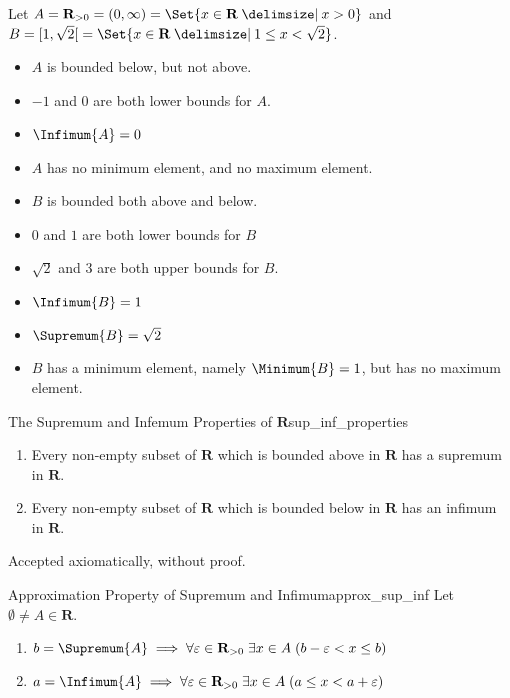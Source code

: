 \begin{Example}{}{}
    Let $ A=\mathbf{R}_{>0}=(0,\infty)=\Set{x\in\mathbf{R}\given x>0} $
    and $ B=\interval[open right]{1}{\sqrt{2}}
        =\Set{x\in\mathbf{R}\given 1\le x<\sqrt{2}} $.
    \begin{itemize}
        \item $ A $ is bounded below, but not above.
        \item $ -1 $ and $ 0 $ are both lower bounds for $ A $.
        \item $ \Infimum{A}=0 $
        \item $ A $ has no minimum element, and no maximum element.
        \item $ B $ is bounded both above and below.
        \item $ 0 $ and $ 1 $ are both lower bounds for $ B $
        \item $ \sqrt{2} $ and $ 3 $ are both upper bounds for $ B $.
        \item $ \Infimum{B}=1 $
        \item $ \Supremum{B}=\sqrt{2} $
        \item $ B $ has a minimum element, namely $ \Minimum{B}=1 $,
              but has no maximum element.
    \end{itemize}
\end{Example}
\begin{Theorem}{The Supremum and Infemum Properties of $ \mathbf{R} $}{sup_inf_properties}
    \begin{enumerate}[label=(\arabic*)]
        \item\label{sup_inf_properties_1}Every non-empty subset of $ \mathbf{R} $
              which is bounded above in $ \mathbf{R} $ has a supremum in $ \mathbf{R} $.
        \item\label{sup_inf_properties_2}Every non-empty subset of $ \mathbf{R} $
              which is bounded below in $ \mathbf{R} $ has an infimum in $ \mathbf{R} $.
    \end{enumerate}
\end{Theorem}
\begin{Proof}{}{}
    Accepted axiomatically, without proof.
\end{Proof}
\begin{Theorem}{Approximation Property of Supremum and Infimum}{approx_sup_inf}
    Let $ \emptyset\neq A\in\mathbf{R} $.
    \begin{enumerate}[label=(\arabic*)]
        \item\label{approx_sup_inf_1}$ b=\Supremum{A}\implies \forall \varepsilon\in\mathbf{R}_{>0}\;
                  \exists x\in A\;(b-\varepsilon<x\le b) $
        \item\label{approx_sup_inf_2} $ a=\Infimum{A}\implies \forall \varepsilon\in\mathbf{R}_{>0}\;
                  \exists x\in A\;(a\le x<a+\varepsilon) $
    \end{enumerate}
\end{Theorem}
